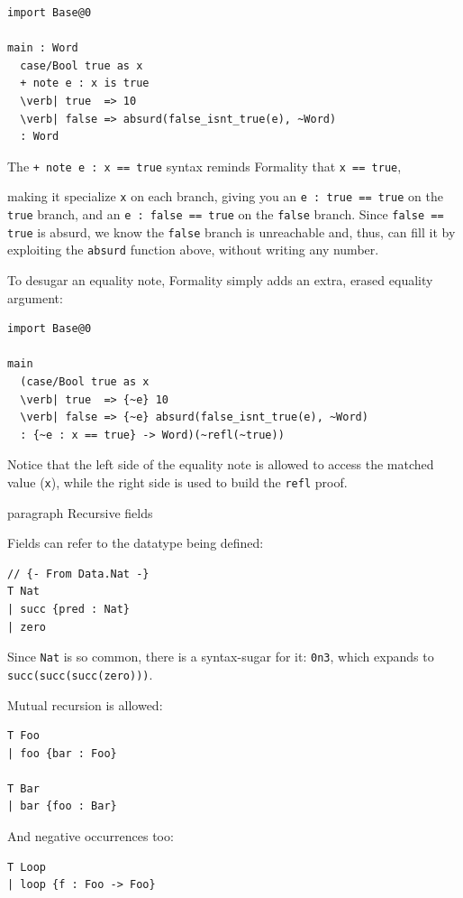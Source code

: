 \documentclass{article}
\theoremstyle{definition}
\theoremstyle{theorem}
\begin{document}
\begin{lstlisting}
import Base@0

main : Word
  case/Bool true as x
  + note e : x is true
  \verb| true  => 10
  \verb| false => absurd(false_isnt_true(e), ~Word)
  : Word
\end{lstlisting}

The \verb|+ note e : x == true| syntax reminds Formality that \verb|x == true|,

making it specialize \verb|x| on each branch, giving you an
\verb|e : true == true| on the \verb|true| branch, and an 
\verb|e : false == true| on the \verb|false| branch. Since \verb|false == true|
is absurd, we know the \verb|false| branch is unreachable and, thus, can fill it
by exploiting the \verb|absurd| function above, without writing any number.

To desugar an equality note, Formality simply adds an extra, erased equality
argument:

\begin{lstlisting}
import Base@0

main
  (case/Bool true as x
  \verb| true  => {~e} 10
  \verb| false => {~e} absurd(false_isnt_true(e), ~Word)
  : {~e : x == true} -> Word)(~refl(~true))
\end{lstlisting}

Notice that the left side of the equality note is allowed to access the matched
value (\verb|x|), while the right side is used to build the \verb|refl| proof.

paragraph{ Recursive fields}

Fields can refer to the datatype being defined:

\begin{lstlisting}
// {- From Data.Nat -}
T Nat
| succ {pred : Nat}
| zero
\end{lstlisting}

Since \verb|Nat| is so common, there is a syntax-sugar for it: \verb|0n3|, which
expands to \verb|succ(succ(succ(zero)))|.

Mutual recursion is allowed:

\begin{lstlisting}
T Foo
| foo {bar : Foo}

T Bar
| bar {foo : Bar}
\end{lstlisting}

And negative occurrences too:

\begin{lstlisting}
T Loop
| loop {f : Foo -> Foo}
\end{lstlisting}
\end{document}
